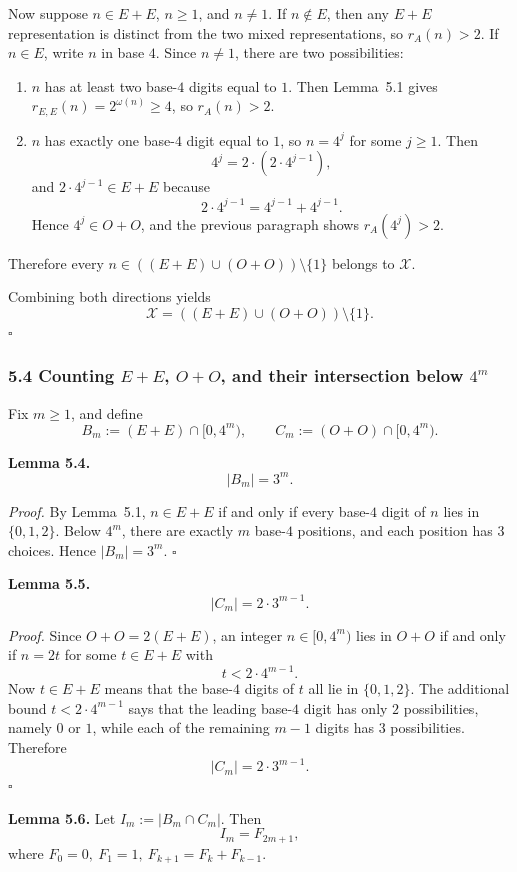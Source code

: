 Now suppose \(n\in E+E\), \(n\ge 1\), and \(n\neq 1\). If \(n\notin E\), then any \(E+E\) representation is distinct from the two mixed representations, so \(r_A(n)>2\). If \(n\in E\), write \(n\) in base \(4\). Since \(n\neq 1\), there are two possibilities:
\begin{enumerate}
\item \(n\) has at least two base-\(4\) digits equal to \(1\). Then Lemma~5.1 gives \(r_{E,E}(n)=2^{\omega(n)}\ge 4\), so \(r_A(n)>2\).
\item \(n\) has exactly one base-\(4\) digit equal to \(1\), so \(n=4^j\) for some \(j\ge 1\). Then
\[
4^j=2\cdot(2\cdot 4^{j-1}),
\]
and \(2\cdot 4^{j-1}\in E+E\) because
\[
2\cdot 4^{j-1}=4^{j-1}+4^{j-1}.
\]
Hence \(4^j\in O+O\), and the previous paragraph shows \(r_A(4^j)>2\).
\end{enumerate}
Therefore every \(n\in((E+E)\cup(O+O))\setminus\{1\}\) belongs to \(\mathcal X\).

Combining both directions yields
\[
\mathcal X=((E+E)\cup(O+O))\setminus\{1\}.
\]
\hfill\(\square\)

\subsubsection*{5.4 Counting \(E+E\), \(O+O\), and their intersection below \(4^m\)}
Fix \(m\ge 1\), and define
\[
B_m:=(E+E)\cap[0,4^m),\qquad
C_m:=(O+O)\cap[0,4^m).
\]

\medskip
\noindent
\textbf{Lemma 5.4.}
\[
|B_m|=3^m.
\]

\medskip
\noindent
\emph{Proof.}
By Lemma~5.1, \(n\in E+E\) if and only if every base-\(4\) digit of \(n\) lies in \(\{0,1,2\}\). Below \(4^m\), there are exactly \(m\) base-\(4\) positions, and each position has \(3\) choices. Hence \(|B_m|=3^m\). \hfill\(\square\)

\medskip
\noindent
\textbf{Lemma 5.5.}
\[
|C_m|=2\cdot 3^{m-1}.
\]

\medskip
\noindent
\emph{Proof.}
Since \(O+O=2(E+E)\), an integer \(n\in[0,4^m)\) lies in \(O+O\) if and only if \(n=2t\) for some \(t\in E+E\) with
\[
t<2\cdot 4^{m-1}.
\]
Now \(t\in E+E\) means that the base-\(4\) digits of \(t\) all lie in \(\{0,1,2\}\). The additional bound \(t<2\cdot 4^{m-1}\) says that the leading base-\(4\) digit has only \(2\) possibilities, namely \(0\) or \(1\), while each of the remaining \(m-1\) digits has \(3\) possibilities. Therefore
\[
|C_m|=2\cdot 3^{m-1}.
\]
\hfill\(\square\)

\medskip
\noindent
\textbf{Lemma 5.6.}
Let \(I_m:=|B_m\cap C_m|\). Then
\[
I_m=F_{2m+1},
\]
where \(F_0=0,\ F_1=1,\ F_{k+1}=F_k+F_{k-1}\).


